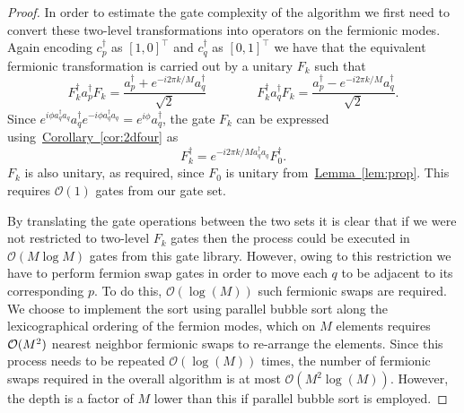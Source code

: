\documentclass[superscriptaddress,aps,pra,nofootinbib,notitlepage,10pt,longbibliography]{revtex4-1}
\newcommand{\lem}[1]{\hyperref[lem:#1]{Lemma~\ref*{lem:#1}}}
\newcommand{\cor}[1]{\hyperref[cor:#1]{Corollary~\ref*{cor:#1}}}
\begin{document}
\begin{proof}
In order to estimate the gate complexity of the algorithm we first need to convert these two-level transformations into operators on the fermionic modes.  Again encoding $c_p^\dagger$ as $[1,0]^\top$ and $c_q^\dagger$ as $[0,1]^\top$ we have that the equivalent fermionic transformation is carried out by a unitary $F_k$ such that
\begin{equation}
F_k^\dagger a_p^\dagger F_k = \frac{a_p^\dagger+e^{-i2\pi k/M}a_q^\dagger}{\sqrt{2}}
%
\qquad \qquad
F_k^\dagger a_q^\dagger F_k = \frac{a_p^\dagger-e^{-i2\pi k/M}a_q^\dagger }{\sqrt{2}}.
\end{equation}
Since $e^{i\phi a_q^\dagger a_q} a_q^\dagger e^{-i\phi a_q^\dagger a_q}=e^{i\phi} a_q^\dagger$, the gate $F_k$ can be expressed using~\cor{2dfour} as
\begin{equation}
F_k^\dagger = e^{-i2\pi k/M a_q^\dagger a_q}F_0^{\dagger}.\label{eq:fermion_gates}
\end{equation}
$F_k$ is also unitary, as required, since $F_0$ is unitary from~\lem{prop}.
This requires $\mathcal{O}(1)$ gates from our gate set.

By translating the gate operations between the two sets it is clear that if we were not restricted to two-level $F_k$ gates then the process could be executed in $\mathcal{O}(M\log M)$ gates from this gate library. However, owing to this restriction we have to perform fermion swap gates in order to move each $q$ to be adjacent to its corresponding $p$. To do this, $\mathcal{O}(\log(M))$ such fermionic swaps are required. We choose to implement the sort using parallel bubble sort along the lexicographical ordering of the fermion modes, which on $M$ elements requires ${\cal O}(M^2)$ nearest neighbor fermionic swaps to re-arrange the elements.  Since this process needs to be repeated $\mathcal{O}(\log(M))$ times, the number of fermionic swaps required in the overall algorithm is at most $\mathcal{O}(M^2 \log(M))$.  However, the depth is a factor of $M$ lower than this if parallel bubble sort is employed.
\end{proof}
\end{document}
